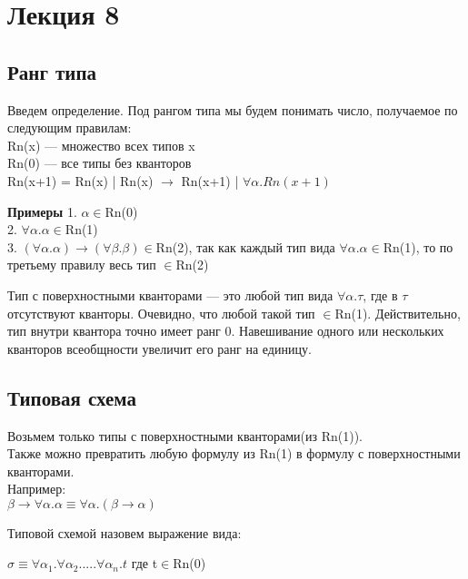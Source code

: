 \section{Лекция 8}
	\subsection{Ранг типа}
	\begin{definition}
		 Введем определение. Под {рангом типа} мы будем понимать число, получаемое по следующим правилам: \\
	    Rn(x) — множество всех типов x\\
	    Rn(0) — все типы без кванторов\\
	    Rn(x+1) = Rn(x) | Rn(x) $\rightarrow$ Rn(x+1) | $\forall\alpha.Rn(x+1)$
	\end{definition}
	 
	\textbf{Примеры}
	 1. $ \alpha\in $Rn(0) \\
	 2. $ \forall\alpha.\alpha \in$Rn(1)\\
	 3. $ (\forall\alpha.\alpha)\rightarrow(\forall\beta.\beta) \in$Rn(2), так как каждый тип вида $ \forall\alpha.\alpha \in$Rn(1), то по третьему правилу весь тип $ \in $Rn(2) \\

	\begin{definition}
		Тип с поверхностными кванторами — это любой тип вида $ \forall\alpha.\tau $, где в $ \tau $ отсутствуют кванторы. Очевидно, что любой такой тип $ \in $Rn(1). Действительно, тип внутри квантора точно имеет ранг 0. Навешивание одного или нескольких кванторов всеобщности увеличит его ранг на единицу.
	\end{definition}
	 
	 \subsection{Типовая схема}
	 Возьмем только типы с поверхностными кванторами(из Rn(1)). \\
	 Также можно превратить любую формулу из Rn(1) в формулу с поверхностными кванторами. \\
	 Например:\\ 
	 $ \beta\rightarrow\forall\alpha.\alpha\equiv\forall\alpha.(\beta\rightarrow\alpha) $
	 \\
	 
	 \begin{definition}
	 	{Типовой схемой} назовем выражение вида: 

\begin{center}
		 $ \sigma\equiv\forall\alpha_1.\forall\alpha_2.....\forall\alpha_n.t $ где t$ \in $Rn(0)
\end{center}
	 	 \end{definition}
 	 
